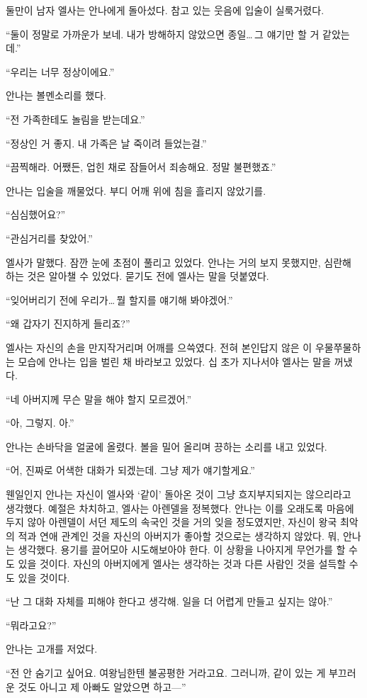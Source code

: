 둘만이 남자 엘사는 안나에게 돌아섰다. 참고 있는 웃음에 입술이 실룩거렸다.

``둘이 정말로 가까운가 보네. 내가 방해하지 않았으면 종일\ldots\,그 얘기만 할 거 같았는데.''

``우리는 너무 정상이에요.''

안나는 볼멘소리를 했다.

``전 가족한테도 놀림을 받는데요.''

``정상인 거 좋지. 내 가족은 날 죽이려 들었는걸.''

``끔찍해라. 어쨌든, 업힌 채로 잠들어서 죄송해요. 정말 불편했죠.''

안나는 입술을 깨물었다. 부디 어깨 위에 침을 흘리지 않았기를.

``심심했어요?''

``관심거리를 찾았어.''

엘사가 말했다. 잠깐 눈에 초점이 풀리고 있었다. 안나는 거의 보지 못했지만, 심란해 하는 것은 알아챌 수 있었다. 묻기도 전에 엘사는 말을 덧붙였다.

``잊어버리기 전에 우리가\ldots\,뭘 할지를 얘기해 봐야겠어.''

``왜 갑자기 진지하게 들리죠?''

엘사는 자신의 손을 만지작거리며 어깨를 으쓱였다. 전혀 본인답지 않은 이 우물쭈물하는 모습에 안나는 입을 벌린 채 바라보고 있었다. 십 초가 지나서야 엘사는 말을 꺼냈다.

``네 아버지께 무슨 말을 해야 할지 모르겠어.''

``아, 그렇지. 아.''

안나는 손바닥을 얼굴에 올렸다. 볼을 밀어 올리며 끙하는 소리를 내고 있었다.

``어, 진짜로 어색한 대화가 되겠는데. 그냥 제가 얘기할게요.''

웬일인지 안나는 자신이 엘사와 `같이' 돌아온 것이 그냥 흐지부지되지는 않으리라고 생각했다. 예절은 차치하고, 엘사는 아렌델을 정복했다. 안나는 이를 오래도록 마음에 두지 않아 아렌델이 서던 제도의 속국인 것을 거의 잊을 정도였지만, 자신이 왕국 최악의 적과 연애 관계인 것을 자신의 아버지가 좋아할 것으로는 생각하지 않았다. 뭐, 안나는 생각했다. 용기를 끌어모아 시도해보아야 한다. 이 상황을 나아지게 무언가를 할 수도 있을 것이다. 자신의 아버지에게 엘사는 생각하는 것과 다른 사람인 것을 설득할 수도 있을 것이다.

``난 그 대화 자체를 피해야 한다고 생각해. 일을 더 어렵게 만들고 싶지는 않아.''

``뭐라고요?''

안나는 고개를 저었다.

``전 안 숨기고 싶어요. 여왕님한텐 불공평한 거라고요. 그러니까, 같이 있는 게 부끄러운 것도 아니고 제 아빠도 알았으면 하고—''

